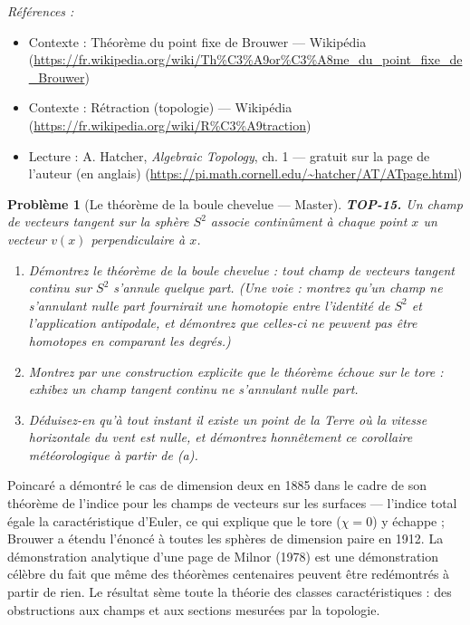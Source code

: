 \documentclass[11pt]{article}
\newtheorem{problem}{Problème}
\newenvironment{refs}{\par\small\noindent\emph{Références :}\begin{itemize}\setlength\itemsep{0pt}}{\end{itemize}\normalsize}
\begin{document}
\begin{refs}
\item Contexte : Théorème du point fixe de Brouwer --- Wikipédia (\url{https://fr.wikipedia.org/wiki/Th%C3%A9or%C3%A8me_du_point_fixe_de_Brouwer})
\item Contexte : Rétraction (topologie) --- Wikipédia (\url{https://fr.wikipedia.org/wiki/R%C3%A9traction})
\item Lecture : A. Hatcher, \textit{Algebraic Topology}, ch. 1 --- gratuit sur la page de l'auteur (en anglais) (\url{https://pi.math.cornell.edu/~hatcher/AT/ATpage.html})
\end{refs}

\bigskip

\begin{problem}[{Le théorème de la boule chevelue --- Master}]
\textbf{TOP-15.} Un champ de vecteurs tangent sur la sphère $ S^2 $ associe continûment à chaque
point $ x $ un vecteur $ v(x) $ perpendiculaire à $ x $.
\begin{enumerate}
\item[(a)] Démontrez le théorème de la boule chevelue : tout champ de vecteurs tangent continu sur $ S^2 $
s'annule quelque part. (Une voie : montrez qu'un champ ne s'annulant nulle part fournirait une homotopie
entre l'identité de $ S^2 $ et l'application antipodale, et démontrez que celles-ci ne peuvent pas
être homotopes en comparant les degrés.)
\item[(b)] Montrez par une construction explicite que le théorème échoue sur le tore : exhibez un champ
tangent continu ne s'annulant nulle part.
\item[(c)] Déduisez-en qu'à tout instant il existe un point de la Terre où la vitesse horizontale du vent est
nulle, et démontrez honnêtement ce corollaire météorologique à partir de (a).
\end{enumerate}

\end{problem}

\noindent Poincaré a démontré le cas de dimension deux en 1885 dans le cadre de son théorème de
l'indice pour les champs de vecteurs sur les surfaces --- l'indice total égale la caractéristique d'Euler,
ce qui explique que le tore ($ \chi = 0 $) y échappe ; Brouwer a étendu l'énoncé à toutes les sphères de
dimension paire en 1912. La démonstration analytique d'une page de Milnor (1978) est une démonstration
célèbre du fait que même des théorèmes centenaires peuvent être redémontrés à partir de rien. Le résultat
sème toute la théorie des classes caractéristiques : des obstructions aux champs et aux sections mesurées
par la topologie.
\end{document}
